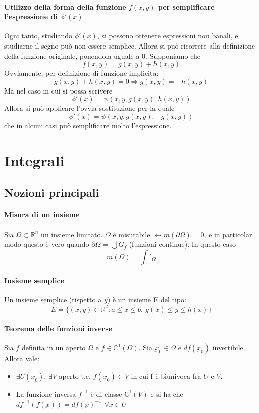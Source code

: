 \documentclass[a4paper,12pt]{book}
\begin{document}
\paragraph{Utilizzo della forma della funzione $f(x, y)$ per semplificare l'espressione di $\phi'(x)$}
Ogni tanto, studiando $\phi'(x)$, si possono ottenere espressioni non banali, e studiarne il segno può non essere semplice. Allora si può ricorrere alla definizione della funzione originale, ponendola uguale a 0. Supponiamo che
$$ f(x,y) = g(x,y)+h(x,y) $$
Ovviamente, per definizione di funzione implicita:
$$ g(x,y)+h(x,y) = 0 \Rightarrow g(x, y) = -h(x,y)$$
Ma nel caso in cui si possa scrivere
$$ \phi'(x) = \psi(x, y, g(x,y), h(x, y))$$
Allora si può applicare l'ovvia sostituzione per la quale
$$ \phi'(x) = \psi(x, y, g(x,y), -g(x, y))$$
che in alcuni casi può semplificare molto l'espressione.

\section{Integrali}
\subsection{Nozioni principali}
\paragraph{Misura di un insieme}
Sia $\Omega \subset \mathbb{R}^n$ un insieme limitato. $\Omega$ è misurabile $\leftrightarrow m(\partial\Omega) = 0$, e in particolar modo questo è vero quando $\partial\Omega = \bigcup G_f$ (funzioni continue).
In questo caso
$$m(\Omega) = \int \mathbb{I}_\Omega$$
\paragraph{Insieme semplice}
Un insieme semplice (rispetto a $y$) è un insieme E del tipo:
$$ E = \{(x, y) \in \mathbb{R}^2 : a\leq x\leq b,\ g(x)\leq y\leq h(x) \} $$

\paragraph{Teorema delle funzioni inverse}
Sia $f$ definita in un aperto $\Omega$ e $f\in \mathbb{C}^1(\Omega)$. Sia $\underbar{x}_0 \in \Omega$ e $df(\underbar{x}_0)$ invertibile. Allora vale:
\begin{itemize}
 \item $\exists U(\underbar{x}_0)$, $\exists V$ aperto t.c. $f(\underbar{x}_0)\in V$ in cui f è biunivoca fra $U$ e $V$.
 \item La funzione inversa $f^{-1}$ è di classe $\mathbb{C}^1(V)$ e si ha che $df^{-1}(f(\underbar{x})) = df(\underbar{x})^{-1}$ $\forall x \in U$
\end{itemize}
\end{document}

